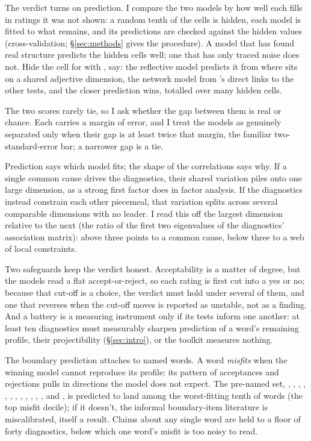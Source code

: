 \documentclass[12pt]{article}
\begin{document}
The verdict turns on prediction. I compare the two models by how well each fills
in ratings it was not shown: a random tenth of the cells is hidden, each model is
fitted to what remains, and its predictions are checked against the hidden values
(cross-validation; \S\ref{sec:methods} gives the procedure). A model that has
found real structure predicts the hidden cells well; one that has only traced
noise does not. Hide the cell for  with , say: the
reflective model predicts it from where  sits on a shared adjective
dimension, the network model from 's direct links to the other
tests, and the closer prediction wins, totalled over many hidden cells.

The two scores rarely tie, so I ask whether the gap between them is real or
chance. Each carries a margin of error, and I treat the models as genuinely
separated only when their gap is at least twice that margin, the familiar
two-standard-error bar; a narrower gap is a tie.

Prediction says which model fits; the shape of the correlations says why. If a
single common cause drives the diagnostics, their shared variation piles onto one
large dimension, as a strong first factor does in factor analysis. If the
diagnostics instead constrain each other piecemeal, that variation splits across
several comparable dimensions with no leader. I read this off the largest
dimension relative to the next (the ratio of the first two eigenvalues of the
diagnostics' association matrix): above three points to a common cause, below
three to a web of local constraints.

Two safeguards keep the verdict honest. Acceptability is a matter of degree, but
the models read a flat accept-or-reject, so each rating is first cut into a yes or
no; because that cut-off is a choice, the verdict must hold under several of them,
and one that reverses when the cut-off moves is reported as unstable, not as a
finding. And a battery is a measuring instrument only if its tests inform one
another: at least ten diagnostics must measurably sharpen prediction of a word's
remaining profile, their projectibility (\S\ref{sec:intro}), or the toolkit
measures nothing.

The boundary prediction attaches to named words. A word \emph{misfits} when the
winning model cannot reproduce its profile: its pattern of acceptances and
rejections pulls in directions the model does not expect. The pre-named set,
, , , , ,
, , , , ,
, , and , is predicted to land among the
worst-fitting tenth of words (the top misfit decile); if it doesn't, the informal
boundary-item literature is miscalibrated, itself a result. Claims about any
single word are held to a floor of forty diagnostics, below which one word's
misfit is too noisy to read.
\end{document}
